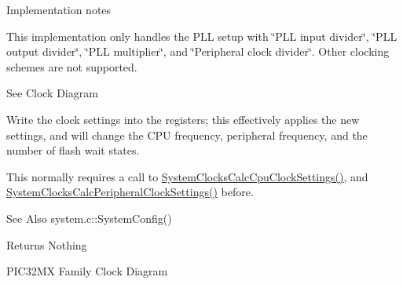 Implementation notes

This implementation only handles the P\-L\-L setup with \char`\"{}\-P\-L\-L input
divider\char`\"{}, \char`\"{}\-P\-L\-L output divider\char`\"{}, \char`\"{}\-P\-L\-L multiplier\char`\"{}, and \char`\"{}\-Peripheral
clock divider\char`\"{}. Other clocking schemes are not supported.

See Clock Diagram

Write the clock settings into the registers; this effectively applies the new settings, and will change the C\-P\-U frequency, peripheral frequency, and the number of flash wait states.

This normally requires a call to \hyperlink{p32_2include_2pinguino_2core_2system_8c_afd2a7efda519abd86c744c9f408f7a48}{System\-Clocks\-Calc\-Cpu\-Clock\-Settings()}, and \hyperlink{p32_2include_2pinguino_2core_2system_8c_a76fffc8659a55a8d4a843bc32f79100f}{System\-Clocks\-Calc\-Peripheral\-Clock\-Settings()} before.

\begin{DoxySeeAlso}{See Also}
system.\-c\-::\-System\-Config()
\end{DoxySeeAlso}
\begin{DoxyReturn}{Returns}
Nothing
\end{DoxyReturn}
P\-I\-C32\-M\-X Family Clock Diagram 